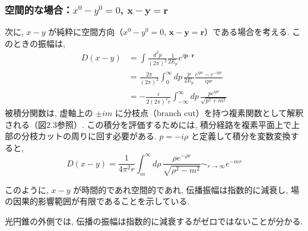 \documentclass[a4paper,12pt]{article}
\begin{document}
\subsubsection*{空間的な場合：$x^0 - y^0 = 0$, $\mathbf{x} - \mathbf{y} = \mathbf{r}$}
次に, $x - y$ が純粋に空間方向（$x^0 - y^0 = 0$, $\mathbf{x} - \mathbf{y} = \mathbf{r}$）である場合を考える. このときの振幅は,
\begin{align*}
D(x - y) &= \int \frac{d^3 p}{(2\pi)^3} \frac{1}{2E_p} e^{i \mathbf{p} \cdot \mathbf{r}} \\
&= \frac{2\pi}{(2\pi)^3} \int_0^\infty dp \, \frac{p}{2E_p} \frac{e^{ipr} - e^{-ipr}}{ipr} \\
&= -\frac{i}{2(2\pi)^2 r} \int_{-\infty}^\infty dp \, \frac{p e^{ipr}}{\sqrt{p^2 + m^2}}
\end{align*}
被積分関数は, 虚軸上の $\pm im$ に分枝点（branch cut）を持つ複素関数として解釈される（図2.3参照）. この積分を評価するためには, 積分経路を複素平面上で上部の分枝カットの周りに回す必要がある. $p = -i\rho$ と定義して積分を変数変換すると,
\begin{equation*}
D(x - y) = \frac{1}{4\pi^2 r} \int_m^\infty d\rho \, \frac{\rho e^{-\rho r}}{\sqrt{\rho^2 - m^2}} \sim_{r \to \infty} e^{-mr} \tag{2.52}
\end{equation*}

このように, $x - y$ が時間的であれ空間的であれ, 伝播振幅は指数的に減衰し, 場の因果的影響範囲が有限であることを示している.

光円錐の外側では, 伝播の振幅は指数的に減衰するがゼロではないことが分かる.
\end{document}
